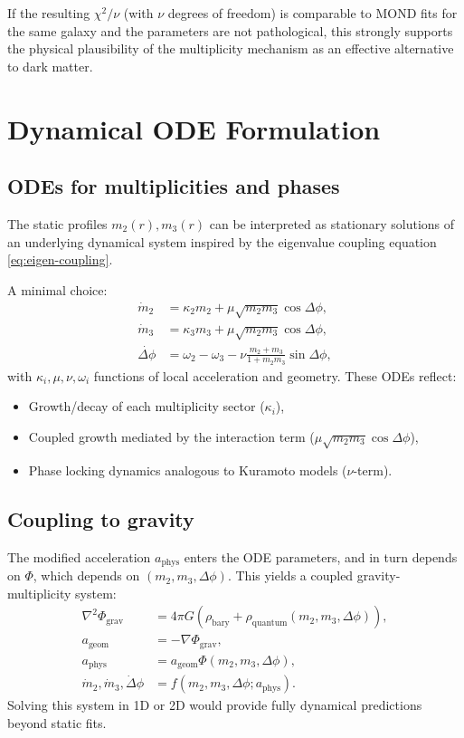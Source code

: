 \documentclass[11pt]{article}
\begin{document}
If the resulting \(\chi^2/\nu\) (with \(\nu\) degrees of freedom) is comparable to MOND fits for the same galaxy and the parameters are not pathological, this strongly supports the physical plausibility of the multiplicity mechanism as an effective alternative to dark matter.

\section{Dynamical ODE Formulation}

\subsection{ODEs for multiplicities and phases}

The static profiles \(m_2(r),m_3(r)\) can be interpreted as stationary solutions of an underlying dynamical system inspired by the eigenvalue coupling equation \eqref{eq:eigen-coupling}.

A minimal choice:
\begin{align}
\dot m_2 &= \kappa_2 m_2 + \mu\sqrt{m_2m_3}\cos\Delta\phi,\\
\dot m_3 &= \kappa_3 m_3 + \mu\sqrt{m_2m_3}\cos\Delta\phi,\\
\dot{\Delta\phi} &= \omega_2 - \omega_3 - \nu\frac{m_2+m_3}{1+m_2m_3}\sin\Delta\phi,
\end{align}
with \(\kappa_i,\mu,\nu,\omega_i\) functions of local acceleration and geometry. These ODEs reflect:
\begin{itemize}
\item Growth/decay of each multiplicity sector (\(\kappa_i\)),
\item Coupled growth mediated by the interaction term (\(\mu\sqrt{m_2m_3}\cos\Delta\phi\)),
\item Phase locking dynamics analogous to Kuramoto models (\(\nu\)-term).
\end{itemize}

\subsection{Coupling to gravity}

The modified acceleration \(a_{\mathrm{phys}}\) enters the ODE parameters, and in turn depends on \(\Phi\), which depends on \((m_2,m_3,\Delta\phi)\). This yields a coupled gravity-multiplicity system:
\begin{align}
\nabla^2\Phi_{\mathrm{grav}} &= 4\pi G (\rho_{\mathrm{bary}} + \rho_{\mathrm{quantum}}(m_2,m_3,\Delta\phi)),\\
a_{\mathrm{geom}} &= -\nabla\Phi_{\mathrm{grav}},\\
a_{\mathrm{phys}} &= a_{\mathrm{geom}}\Phi(m_2,m_3,\Delta\phi),\\
\dot m_2,\dot m_3,\dot\Delta\phi &= f(m_2,m_3,\Delta\phi;a_{\mathrm{phys}}).
\end{align}
Solving this system in 1D or 2D would provide fully dynamical predictions beyond static fits.
\end{document}
